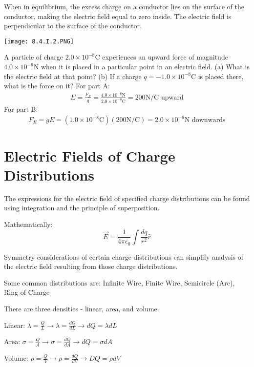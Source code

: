 \documentclass[../em.tex]{subfiles}
\begin{document}
When in equilibrium, the excess charge on a conductor lies on the surface of the conductor, making the electric field equal to zero inside. The electric field is perpendicular to the surface of the conductor.
\begin{center}
    \texttt{[image: 8.4.I.2.PNG]}
\end{center}


\begin{example}
    A particle of charge $2.0\times10^{-8}$C experiences an upward force of magnitude $4.0\times10^{-6}$N when it is placed in a particular point in an electric field. (a) What is the electric field at that point? (b) If a charge $q=-1.0\times10^{-8}$C is placed there, what is the force on it?
    \smallbreak
    For part A:
    \begin{align*}
    E=\frac{F_E}{q}=\frac{4.0\times10^{-6}\text{N}}{2.0\times10^{-8}\text{C}}=200\text{N/C upward}
    \end{align*}
    For part B:
    \begin{align*}
    F_E=gE=(1.0\times10^{-8}\text{C})(200\text{N/C})=2.0\times10^{-6}\text{N downwards}
    \end{align*}

\end{example}
\section{Electric Fields of Charge Distributions}
The expressions for the electric field of specified charge distributions can be found using integration and the principle of superposition. 

Mathematically:
\[\vec{E}=\frac{1}{4\pi\epsilon_0}\int\frac{dq}{r^2}\hat{r}\]

Symmetry considerations of certain charge distributions can simplify analysis of the electric field resulting from those charge distributions.

Some common distributions are: Infinite Wire, Finite Wire, Semicircle (Arc), Ring of Charge 

There are three densities - linear, area, and volume. 

Linear: $\lambda=\frac{Q}{L}\longrightarrow \lambda = \frac{dQ}{dL} \longrightarrow dQ=\lambda dL$

Area: $\sigma=\frac{Q}{A}\longrightarrow \sigma = \frac{dQ}{dA}\longrightarrow dQ=\sigma dA$

Volume: $\rho = \frac{Q}{V}\longrightarrow \rho = \frac{dQ}{dV} \longrightarrow DQ=\rho dV$
\end{document}
